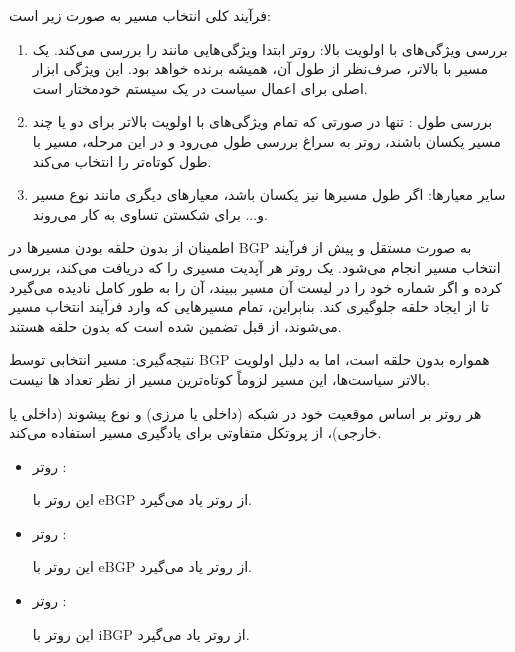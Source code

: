 فرآیند کلی انتخاب مسیر به صورت زیر است:
\begin{enumerate}
	\item
	 {بررسی ویژگی‌های با اولویت بالا:} 
	 روتر ابتدا ویژگی‌هایی مانند {} را بررسی می‌کند. یک مسیر با  بالاتر، {صرف‌نظر از طول  آن}، همیشه برنده خواهد بود. این ویژگی ابزار اصلی برای اعمال سیاست در یک سیستم خودمختار است.
	
	\item {بررسی طول  :} 
	تنها در صورتی که تمام ویژگی‌های با اولویت بالاتر برای دو یا چند مسیر یکسان باشند، روتر به سراغ بررسی طول  می‌رود و در این مرحله، مسیر با طول کوتاه‌تر را انتخاب می‌کند.
	
	\item {سایر معیارها:}
	 اگر طول مسیرها نیز یکسان باشد، معیارهای دیگری مانند نوع مسیر و... برای شکستن تساوی به کار می‌روند.
\end{enumerate}


اطمینان از بدون حلقه بودن مسیرها در {BGP} به صورت مستقل و پیش از فرآیند انتخاب مسیر انجام می‌شود. یک روتر هر آپدیت مسیری را که دریافت می‌کند، بررسی کرده و اگر شماره  خود را در لیست  آن مسیر ببیند، آن را به طور کامل نادیده می‌گیرد تا از ایجاد حلقه جلوگیری کند. بنابراین، تمام مسیرهایی که وارد فرآیند انتخاب مسیر می‌شوند، از قبل تضمین شده است که بدون حلقه هستند.

{نتیجه‌گیری:} مسیر انتخابی توسط {BGP} همواره بدون حلقه است، اما به دلیل اولویت بالاتر سیاست‌ها، این مسیر لزوماً کوتاه‌ترین مسیر از نظر تعداد ها نیست.







هر روتر بر اساس موقعیت خود در شبکه (داخلی یا مرزی) و نوع پیشوند (داخلی یا خارجی)، از پروتکل متفاوتی برای یادگیری مسیر استفاده می‌کند.

\begin{itemize}
	
	\item روتر :

این روتر با eBGP از روتر
یاد می‌گیرد.


	\item روتر :
	
	این روتر با eBGP از روتر
	یاد می‌گیرد.
	
		\item روتر :
	
	این روتر با iBGP از روتر
	یاد می‌گیرد.
	
\end{itemize}


